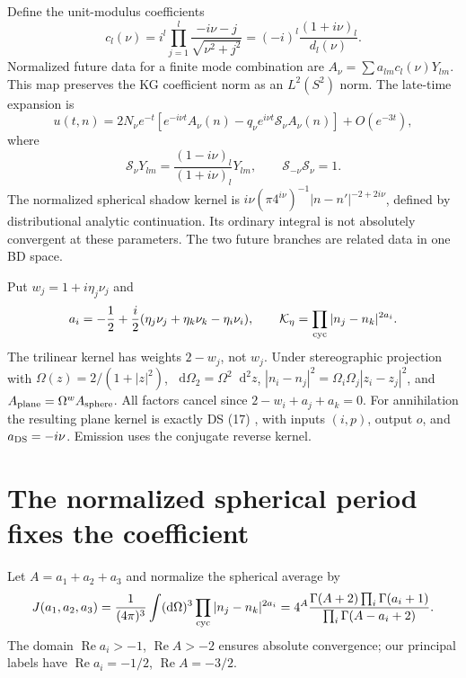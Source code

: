 \documentclass[11pt,a4paper]{article}
\newcommand{\dd}{\mathop{}\!\mathrm d}
\newcommand{\cS}{\mathcal S}
\begin{document}
Define the unit-modulus coefficients
\begin{equation}
 c_l(\nu)=i^l\prod_{j=1}^l\frac{-i\nu-j}{\sqrt{\nu^2+j^2}}
 =(-i)^l\frac{(1+i\nu)_l}{d_l(\nu)}.
\end{equation}
Normalized future data for a finite mode combination are
$A_\nu=\sum a_{lm}c_l(\nu)Y_{lm}$. This map preserves the KG
coefficient norm as an $L^2(S^2)$ norm. The late-time expansion is
\begin{equation}
 u(t,n)=2N_\nu e^{-t}
 \left[e^{-i\nu t}A_\nu(n)
       -q_\nu e^{i\nu t}\cS_\nu A_\nu(n)\right]+O(e^{-3t}),
\end{equation}
where
\begin{equation}
 \cS_\nu Y_{lm}=\frac{(1-i\nu)_l}{(1+i\nu)_l}Y_{lm},
 \qquad \cS_{-\nu}\cS_\nu=1.
\end{equation}
The normalized spherical shadow kernel is
$i\nu(\pi4^{i\nu})^{-1}|n-n'|^{-2+2i\nu}$, defined by distributional
analytic continuation. Its ordinary integral is not absolutely
convergent at these parameters. The two future branches are related
data in one BD space.

Put $w_j=1+i\eta_j\nu_j$ and
\begin{equation}
 a_i=-\frac12+\frac i2(\eta_j\nu_j+\eta_k\nu_k-\eta_i\nu_i),\qquad
 \mathcal K_\eta=\prod_{\rm cyc}|n_j-n_k|^{2a_i}.
 \label{eq:kernel}
\end{equation}
The trilinear kernel has weights $2-w_j$, not $w_j$.
Under stereographic projection with $\Omega(z)=2/(1+|z|^2)$,
$\dd\Omega_2=\Omega^2\dd^2z$,
$|n_i-n_j|^2=\Omega_i\Omega_j|z_i-z_j|^2$, and
$A_{\rm plane}=\Omega^w A_{\rm sphere}$.
All factors cancel since $2-w_i+a_j+a_k=0$.
For annihilation the resulting plane kernel is exactly DS (17)
\cite{ds}, with inputs $(i,p)$, output $o$, and $a_{\rm DS}=-i\nu$.
Emission uses the conjugate reverse kernel.

\newpage
\section{The normalized spherical period fixes the coefficient}
Let $A=a_1+a_2+a_3$ and normalize the spherical average by
\begin{equation}
 J(a_1,a_2,a_3)=\frac{1}{(4\pi)^3}\int(\dd\Omega)^3
 \prod_{\rm cyc}|n_j-n_k|^{2a_i}
 =4^A\frac{\Gamma(A+2)\prod_i\Gamma(a_i+1)}
             {\prod_i\Gamma(A-a_i+2)}.
 \label{eq:period}
\end{equation}
The domain $\operatorname{Re}a_i>-1$, $\operatorname{Re}A>-2$
ensures absolute convergence; our principal labels have
$\operatorname{Re}a_i=-1/2$, $\operatorname{Re}A=-3/2$.
\end{document}
